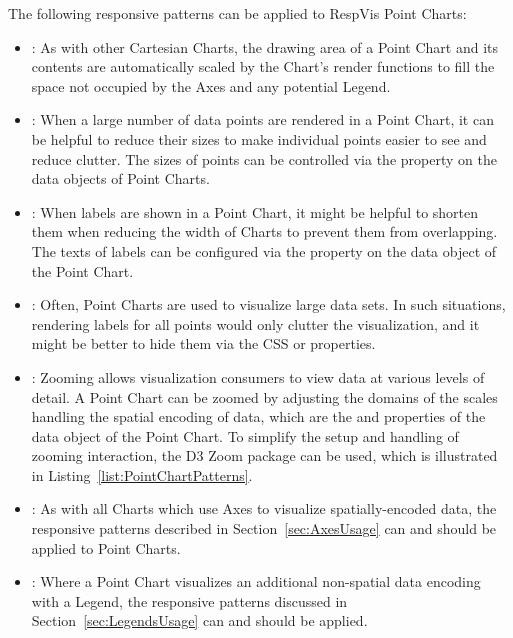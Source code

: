 The following responsive patterns can be applied to RespVis Point
Charts:
\begin{itemize}
\item {}: As with other Cartesian Charts, the
  drawing area of a Point Chart and its contents are automatically
  scaled by the Chart's render functions to fill the space not
  occupied by the Axes and any potential Legend.

\item {}: When a large number of data points are
  rendered in a Point Chart, it can be helpful to reduce their sizes
  to make individual points easier to see and reduce clutter. The
  sizes of points can be controlled via the  property
  on the data objects of Point Charts.

\item {}: When labels are shown in a Point
  Chart, it might be helpful to shorten them when reducing the width
  of Charts to prevent them from overlapping. The texts of labels can
  be configured via the  property on the data object of
  the Point Chart.

\item {}: Often, Point Charts are used to
  visualize large data sets. In such situations, rendering labels
  for all points would only clutter the visualization, and it might be
  better to hide them via the CSS  or 
  properties.

\item {}: Zooming allows visualization
  consumers to view data at various levels of detail. A Point Chart
  can be zoomed by adjusting the domains of the scales handling the
  spatial encoding of data, which are the  and
   properties of the data object of the Point Chart. To
  simplify the setup and handling of zooming interaction, the D3 Zoom
  package \parencite{D3Zoom} can be used, which is illustrated in
  Listing~\ref{list:PointChartPatterns}.

\item {}: As with all Charts which use Axes
  to visualize spatially-encoded data, the responsive patterns
  described in Section~\ref{sec:AxesUsage} can and should be applied
  to Point Charts.

\item {}: Where a Point Chart visualizes
  an additional non-spatial data encoding with a Legend, the
  responsive patterns discussed in Section~\ref{sec:LegendsUsage} can
  and should be applied.
\end{itemize}







